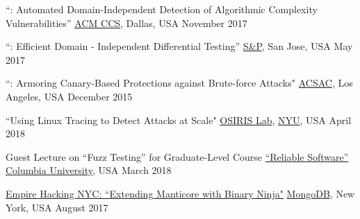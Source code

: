 
\vspace{0.025in}

\vspace{0.025in}
\begin{cvhonorswide2}
    \cvhonorwide
    {}
    {``\slowfuzz: Automated Domain-Independent Detection of Algorithmic Complexity Vulnerabilities''}
    {\href{https://ccs2017.sigsac.org/}{ACM CCS}, Dallas, USA}
    {November 2017}
\end{cvhonorswide2}

\vspace{0.025in}
\begin{cvhonorswide2}
    \cvhonorwide
    {}
    {``\nezha: Efficient Domain - Independent Differential Testing''}
    {\href{https://www.ieee-security.org/TC/SP2017/}{S\&P}, San Jose, USA}
    {May 2017}
\end{cvhonorswide2}

\vspace{0.025in}
\begin{cvhonorswide2}
  \cvhonorwide
    {}
    {``\dynaguard: Armoring Canary-Based Protections against Brute-force Attacks"}
    {\href{https://www.acsac.org/2015/}{ACSAC}, Los Angeles, USA}
    {December 2015}

\end{cvhonorswide2}


\vspace{0.025in}
\begin{cvhonorswide2}
\cvhonorwide
    {}
    {``Using Linux Tracing to Detect Attacks at Scale"}
    {\href{https://www.osiris.cyber.nyu.edu/}{OSIRIS Lab}, \href{https://engineering.nyu.edu/}{NYU}, USA}
    {April 2018}
\end{cvhonorswide2}

\vspace{0.025in}
\begin{cvhonorswide2}
\cvhonorwide
    {}
    {Guest Lecture on ``Fuzz Testing'' for Graduate-Level Course \href{http://www.cs.columbia.edu/~junfeng/18sp-e6121/syllabus.html}{``Reliable Software''}}
    {\href{http://www.cs.columbia.edu/}{Columbia University}, USA}
    {March 2018}
\end{cvhonorswide2}

\vspace{0.025in}
\begin{cvhonorswide2}
\cvhonorwide
    {}
    {\href{https://www.meetup.com/Empire-Hacking/events/239192018}{Empire
            Hacking NYC: ``Extending Manticore with Binary Ninja"}}
    {\href{https://www.mongodb.com/}{MongoDB}, New York, USA}
    {August 2017}
\end{cvhonorswide2}

